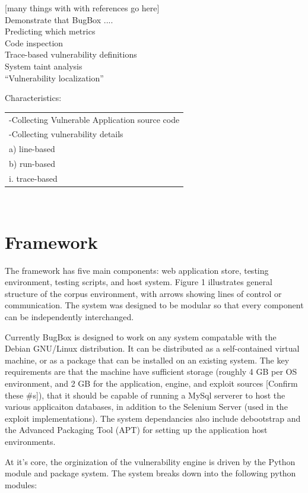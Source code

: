 \documentclass[letterpaper,twocolumn,10pt]{article}
\begin{document}
[many things with with references go here] \\
Demonstrate that BugBox ....\\
Predicting which metrics  \\

Code inspection\\
Trace-based vulnerability definitions\\
System taint analysis\\


``Vulnerability localization''

Characteristics:
 \begin{tabular} { l }
   -Collecting Vulnerable Application source code\\
   -Collecting vulnerability details\\
     a) line-based\\
     b) run-based\\
      i. trace-based\\
 \end{tabular}\\


\section{Framework}

The framework has five main components: web application store, testing environment, testing scripts, and host system. Figure 1 illustrates general structure of the corpus environment, with arrows showing lines of control or communication. The system was designed to be modular so that every component can be independently interchanged.\par
Currently BugBox is designed to work on any system compatable with the Debian GNU/Linux distribution. It can be distributed as a self-contained virtual machine, or as a package that can be installed on an existing system. The key requirements are that the machine have sufficient storage (roughly 4 GB per OS environment, and 2 GB for the application, engine, and exploit sources [Confirm these \#s]), that it should be capable of running a MySql serverer to host the various applicaiton databases, in addition to the Selenium Server (used in the exploit implementations). The system dependancies also include debootstrap and the Advanced Packaging Tool (APT) for setting up the application host environments.
   
At it's core, the orginization of the vulnerability engine is driven by the Python module and package system. The system breaks down into the following python modules:
\end{document}
